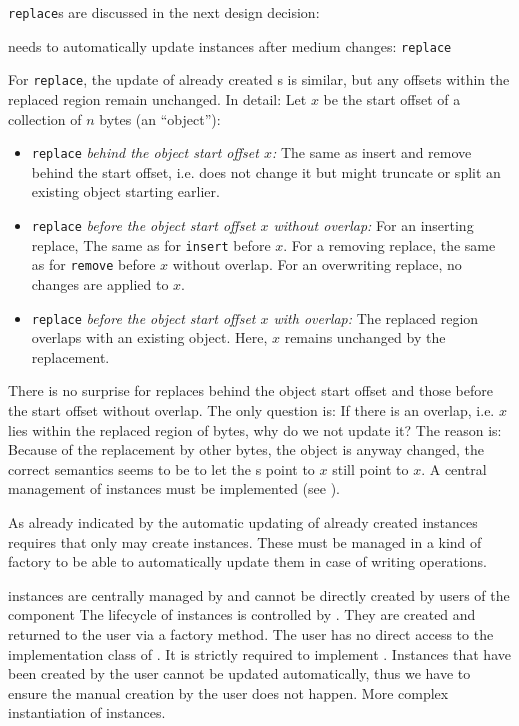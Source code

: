 \texttt{replace}s are discussed in the next design decision:

{%
\COMPmedia{} needs to automatically update \IMediumReference{} instances after medium changes: \texttt{replace}
}
{%
For \texttt{replace}, the update of already created \IMediumReference{}s is similar, but any offsets within the replaced region remain unchanged. In detail: Let $x$ be the start offset of a collection of $n$ bytes (an ``object''):
\begin{itemize}
\item \texttt{replace} \emph{behind the object start offset $x$:} The same as insert and remove behind the start offset, i.e. does not change it but might truncate or split an existing object starting earlier.
\item \texttt{replace} \emph{before the object start offset $x$ without overlap:} For an inserting replace, The same as for \texttt{insert} before $x$. For a removing replace, the same as for \texttt{remove} before $x$ without overlap. For an overwriting replace, no changes are applied to $x$.
\item \texttt{replace} \emph{before the object start offset $x$ with overlap:} The replaced region overlaps with an existing object. Here, $x$ remains unchanged by the replacement.
\end{itemize}
}
{%
There is no surprise for replaces behind the object start offset and those before the start offset without overlap. The only question is: If there is an overlap, i.e. $x$ lies within the replaced region of bytes, why do we not update it? The reason is: Because of the replacement by other bytes, the object is anyway changed, the correct semantics seems to be to let the \IMediumReference{}s point to $x$ still point to $x$.
}
{%
A central management of \IMediumReference{} instances must be implemented (see ).
}

As already indicated by  the automatic updating of already created \IMediumReference{} instances requires that only \COMPmedia{} may create \IMediumReference{} instances. These must be managed in a kind of factory to be able to automatically update them in case of writing operations.

{%
\IMediumReference{} instances are centrally managed by \COMPmedia{} and cannot be directly created by users of the component
}
{%
The lifecycle of \IMediumReference{} instances is controlled by \COMPmedia{}. They are created and returned to the user via a factory method. The user has no direct access to the implementation class of \IMediumReference{}.
}
{%
It is strictly required to implement . Instances that have been created by the user cannot be updated automatically, thus we have to ensure the manual creation by the user does not happen.
}
{%
More complex instantiation of \IMediumReference{} instances.
}

